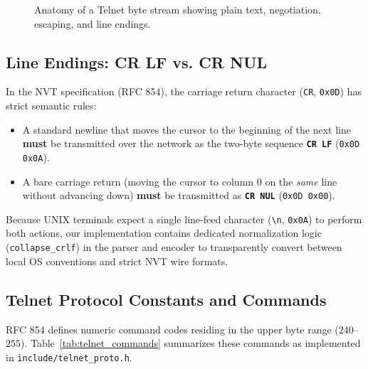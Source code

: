 \begin{figure}[htbp]
\caption{Anatomy of a Telnet byte stream showing plain text, negotiation, escaping, and line endings.}
\label{fig:byte_stream_frame}
\end{figure}

\subsection{Line Endings: CR LF vs. CR NUL}

In the NVT specification (RFC 854), the carriage return character (\texttt{CR}, \texttt{0x0D}) has strict semantic rules:
\begin{itemize}[leftmargin=1.5em]
    \item A standard newline that moves the cursor to the beginning of the next line \textbf{must} be transmitted over the network as the two-byte sequence \textbf{\texttt{CR LF}} (\texttt{0x0D 0x0A}).
    \item A bare carriage return (moving the cursor to column 0 on the \textit{same} line without advancing down) \textbf{must} be transmitted as \textbf{\texttt{CR NUL}} (\texttt{0x0D 0x00}).
\end{itemize}
Because UNIX terminals expect a single line-feed character (\texttt{\textbackslash n}, \texttt{0x0A}) to perform both actions, our implementation contains dedicated normalization logic (\texttt{collapse\_crlf}) in the parser and encoder to transparently convert between local OS conventions and strict NVT wire formats.

\subsection{Telnet Protocol Constants and Commands}

RFC 854 defines numeric command codes residing in the upper byte range ($240$--$255$). Table~\ref{tab:telnet_commands} summarizes these commands as implemented in \texttt{include/telnet\_proto.h}.

